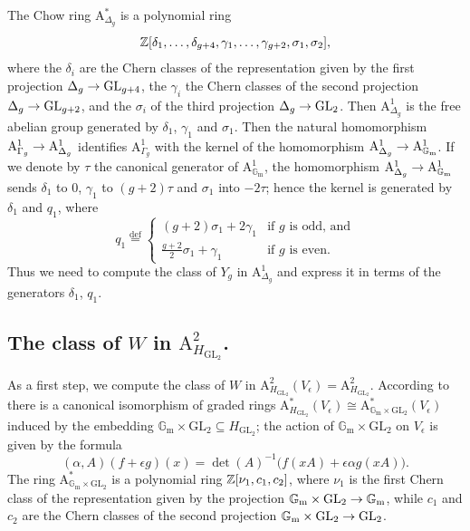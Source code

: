 \documentclass{amsart}
\numberwithin{equation}{section}
\numberwithin{subsection}{section}
\theoremstyle{definition}
\theoremstyle{remark}
\newcommand\rA{\mathrm{A}} \newcommand\rB{\mathrm{B}}
\newcommand\arr{\ifinner\to\else\longrightarrow\fi}
\newcommand\eqdef{\overset{\mathrm{\scriptscriptstyle def}} =}
\newcommand{\GL}{\mathrm{GL}}
\newcommand{\gm}{\mathbb{G}_{\mathrm{m}}}
\newcommand\Hg{H_{\GL_2}}
\newcommand\Ve{V_{\epsilon}}
\begin{document}
The Chow ring $\rA^{*}_{\Delta_{g}}$ is a polynomial ring
   \[
   \mathbb{Z}[\delta_{1}, \dots, \delta_{g+4}, \gamma_{1}, \dots, \gamma_{g+2}, 
   \sigma_{1}, \sigma_{2}],
   \]
where the $\delta_{i}$ are the Chern classes of the representation given by the first projection $\Delta_{g} \arr \GL_{g+4}$, the $\gamma_{i}$ the Chern classes of the second projection $\Delta_{g} \arr \GL_{g+2}$, and the $\sigma_{i}$ of the third projection $\Delta_{g} \arr \GL_{2}$. Then $\rA^{1}_{\Delta_{g}}$ is the free abelian group generated by $\delta_{1}$, $\gamma_{1}$ and $\sigma_{1}$. Then the natural homomorphism $\rA^{1}_{\Gamma_{g}} \arr \rA^{1}_{\Delta_{g}}$ identifies $\rA^{1}_{\Gamma_{g}}$ with the kernel of the homomorphism $\rA^{1}_{\Delta_{g}} \arr \rA^{1}_{\gm}$. If we denote by $\tau$ the canonical generator of $\rA^{1}_{\gm}$, the homomorphism $\rA^{1}_{\Delta_{g}} \arr \rA^{1}_{\gm}$ sends $\delta_{1}$ to $0$, $\gamma_{1}$ to $(g+2)\tau$ and $\sigma_{1}$ into $-2\tau$; hence the kernel is generated by $\delta_{1}$ and $q_{1}$, where 
   \begin{equation}\label{eq:q1}
   q_{1} \eqdef
   \begin{cases}
   (g+2)\sigma_{1} + 2\gamma_{1} & \text{if $g$ is odd, and}\\
   \frac{\displaystyle g+2}{\displaystyle 2}\sigma_{1} + \gamma_{1} 
   & \text{if $g$ is even.}
   \end{cases}
   \end{equation}
Thus we need to compute the class of $Y_{g}$ in $\rA^{1}_{\Delta_{g}}$ and express it in terms of the generators $\delta_{1}$, $q_{1}$.

\subsection*{The class of $W$ in $\rA^{2}_{\Hg}$.}

As a first step, we compute the class of $W$ in $\rA^{2}_{\Hg}(\Ve) = \rA^{2}_{\Hg}$.
According to \cite[Lemma~2.1]{vismol} there is a canonical isomorphism of graded rings $\rA^*_{\Hg}(\Ve)\cong \rA^*_{\gm\times\GL_{2}}(\Ve)$ induced by the embedding $\gm \times \GL_{2} \subseteq \Hg$;
the action of $\gm \times \GL_{2}$ on $\Ve$ is given by the formula
   \[
   (\alpha, A)(f+\epsilon g)(x)
   = \det(A)^{-1}\bigl(f(xA) + \epsilon \alpha g(xA)\bigr).
   \]
The ring $\rA^*_{\gm\times\GL_{2}}$ is a polynomial ring $\mathbb{Z}[\nu_{1}, c_{1}, c_{2}]$, where $\nu_{1}$ is the first Chern class of the representation given by the projection $\gm \times \GL_{2}\arr \gm$, while $c_{1}$ and $c_{2}$ are the Chern classes of the second projection $\gm \times \GL_{2} \arr \GL_{2}$.
\end{document}
